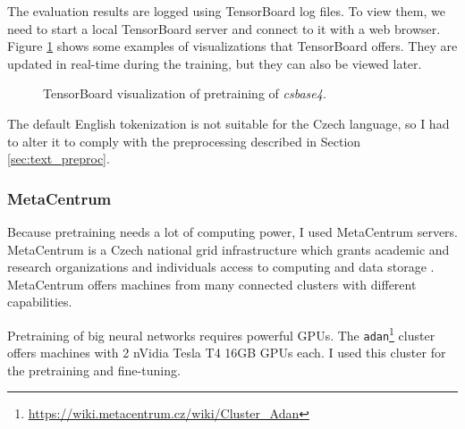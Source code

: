 \documentclass[
  printed, %
  color,   %
  table,   %
  oneside, %
  lof,     %
  lot,     %
]{fithesis3}
\begin{document}
The evaluation results are logged using TensorBoard \parencite{tensorboard} log files. 
To view them, we need to start a local TensorBoard server and connect to it with a web browser. Figure \ref{fig:tb-vis} shows some examples of visualizations that TensorBoard offers. They are updated in real-time during the training, but they can also be viewed later.

\begin{figure}[b!]
    \caption{TensorBoard visualization of pretraining of \textit{csbase4}. }
    \label{fig:tb-vis}
    \centering
\end{figure}

The default English tokenization is not suitable for the Czech language, so I had to alter it to comply with the preprocessing described in Section \ref{sec:text_preproc}. 

\subsubsection{MetaCentrum}
Because pretraining needs a lot of computing power, I used MetaCentrum servers. MetaCentrum is a Czech national grid infrastructure which grants academic and research organizations and individuals access to computing and data storage \parencite{metacentrum}. 
MetaCentrum offers machines from many connected clusters with different capabilities.

Pretraining of big neural networks requires powerful GPUs. The \texttt{adan}\footnote{\url{https://wiki.metacentrum.cz/wiki/Cluster_Adan}} cluster offers machines with 2 nVidia Tesla T4 16GB GPUs each. I used this cluster for the pretraining and fine-tuning.
\end{document}
